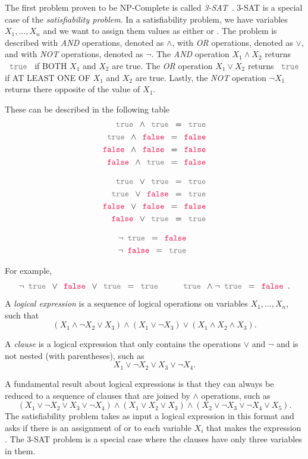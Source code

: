 The first problem proven to be NP-Complete is called \emph{3-SAT}~\cite{}.  3-SAT is a special case of the \emph{satisfiability problem}.   In a satisfiability problem, we have variables $X_1, \dots, X_n$ and we want to assign them values as either \true or \false.  The problem is described with \emph{AND} operations, denoted as $\land$,  with \emph{OR} operations, denoted as $\lor$, and with \emph{NOT} operations, denoted as $\neg$.  The \emph{AND} operation $X_1 \land X_2$ returns $\true$ if BOTH $X_1$ and $X_2$ are true.  The \emph{OR} operation $X_1 \lor X_2$ returns $\true$ if AT LEAST ONE OF  $X_1$ and $X_2$ are true.  Lastly, the \emph{NOT} operation $\neg X_1$ returns there opposite of the value of $X_1$.

These can be described in the following table
\begin{align}
\true \land \true = \true\\
\true \land \false = \false\\
\false \land \false = \false\\
\false \land \true = \false
\end{align}

\begin{align}
\true \lor \true = \true\\
\true \lor \false = \true\\
\false \lor \false = \false\\
\false \lor \true = \true
\end{align}

\begin{align}
\neg \true = \false\\
\neg \false = \true
\end{align}

For example,
$$
\neg \true \lor \false \lor \true = \true \qquad \true \land \neg \true = \false .
$$
A \emph{logical expression} is a sequence of logical operations on variables $X_1, \dots, X_n$, such that 
\begin{equation}
(X_1 \land \neg X_2 \lor X_3) \land (X_1 \lor \neg X_3) \lor (X_1 \land X_2 \land X_3).
\end{equation}

A \emph{clause} is a logical expression that only contains the operations $\lor$ and $\neg$ and is not nested (with parentheses), such as 
\begin{equation}
X_1 \lor \neg X_2 \lor X_3 \lor \neg X_4.
\end{equation}

A fundamental result about logical expressions is that they can always be reduced to a sequence of clauses that are joined by $\land$ operations, such as 
\begin{equation}
(X_1 \lor \neg X_2 \lor X_3 \lor \neg X_4) \land (X_1 \lor X_2 \lor X_3) \land (X_2 \lor \neg X_3 \lor \neg X_4 \lor X_5).
\end{equation}
The satisfiability problem takes as input a logical expression in this format and asks if there is an assignment of \true  or \false to each variable $X_i$ that makes the expression \true.  The 3-SAT problem is a special case where the clauses have only three variables in them.
 
